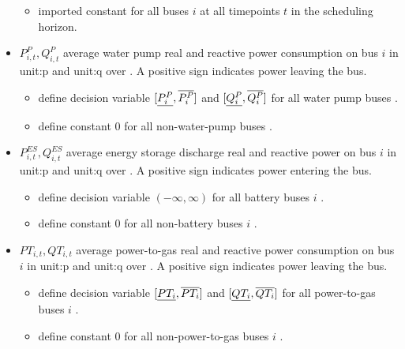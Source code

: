 \begin{itemize}
\begin{itemize}

\item \gls{imported} constant for all buses $i$ at all timepoints $t$ in the
  scheduling horizon.  \end{itemize}

\item $P^P_{i,t}, Q^P_{i,t}$ average water pump real and reactive power
  consumption on bus $i$ in \gls{unit:p} and \gls{unit:q} over \intervaloft{}. A
  positive sign indicates power leaving the
  bus.  \begin{itemize} \item \gls{define} decision variable
  $[\underline{P^P_i}, \overline{P^P_i}]$ and $[\underline{Q^P_i}, \overline{Q^P_i}]$ for all water pump
  buses \atallt{}.  \item \gls{define} constant 0 for all non-water-pump
  buses \atallt{}.  \end{itemize}

\item $P^{ES}_{i,t}, Q^{ES}_{i,t}$ average energy storage discharge real and
  reactive power on bus $i$ in \gls{unit:p} and \gls{unit:q}
  over \intervaloft{}. A positive sign indicates power entering the
  bus.  \begin{itemize} \item \gls{define} decision variable $(-\infty, \infty)$
  for all battery buses $i$ \atallt{}.  \item \gls{define} constant $0$ for all
  non-battery buses $i$ \atallt{}.  \end{itemize}

\item $PT_{i,t}, QT_{i,t}$ average power-to-gas real and reactive power
  consumption on bus $i$ in \gls{unit:p} and \gls{unit:q} over \intervaloft{}. A
  positive sign indicates power leaving the
  bus.  \begin{itemize} \item \gls{define} decision variable
  $[\underline{PT_i}, \overline{PT_i}]$ and $[\underline{QT_i}, \overline{QT_i}]$ for all power-to-gas
  buses $i$ \atallt{}.  \item \gls{define} constant $0$ for all non-power-to-gas
  buses $i$ \atallt{}.  \end{itemize}

\end{itemize}

